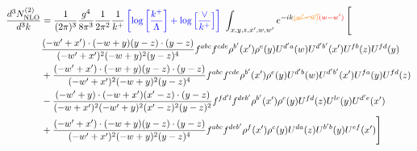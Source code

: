 \documentclass[aps,prd,amsmath,amssymb,nofootinbib]{revtex4-2}
\numberwithin{equation}{section}
\begin{document}
\begin{align}
    \frac{d^{3}N^{(2)}_{\rm NLO}}{d^{3}k} & = \frac{1}{(2\pi)^{3}}\frac{g^{4}}{8\pi^{3}}\frac{1}{2\pi^{2}} \frac{1}{k^{+}}\,{\color{blue}\left[\log{\left[\frac{k^{+}}{\Lambda}\right]}+\log{\left[\frac{\vee}{k^{+}}\right]}\right]}\,\,\int_{x,y,z,x^{\prime},w,w^{\prime}}e^{-ik{\color{orange}\cancel{(w^{\prime}-w)}}{\color{red}(w-w^{\prime})}}\, \Bigg[\notag \\ &  \frac{( - w' + x') \cdot ( - w + y) (y - z) \cdot (y - z)}{( - w' + x')^{2} ( - w + y)^{2} (y - z)^{4}} f^{a b c} f^{c d e} \rho^{b'}(x') \rho^{e}(y) U^{d' a}(w) U^{d' b'}(x') U^{f b}(z) U^{f d}(y)\nonumber\\
        &+ \frac{( - w' + x') \cdot ( - w + y) (y - z) \cdot (y - z)}{( - w' + x')^{2} ( - w + y)^{2} (y - z)^{4}} f^{a b c} f^{c d e} \rho^{b'}(x') \rho^{e}(y) U^{d' b}(w) U^{d' b'}(x') U^{f a}(y) U^{f d}(z)\nonumber\\
    &- \frac{( - w' + y) \cdot ( - w + x') (x' - z) \cdot (y - z)}{( - w + x')^{2} ( - w' + y)^{2} (x' - z)^{2} (y - z)^{2}} f^{f d' l} f^{d e b'} \rho^{b'}(x') \rho^{c}(y) U^{fd}(z) U^{lc}(y) U^{d' e}(x')\nonumber\\
    & + \frac{( - w' + x') \cdot ( - w + y) (y - z) \cdot (y - z)}{( - w' + x')^{2} ( - w + y)^{2} (y - z)^{4}} f^{a b c} f^{d e b'} \rho^{f}(x') \rho^{c}(y) U^{da}(z) U^{b'b}(y) U^{e f}(x')\Bigg]
\end{align}
\end{document}

